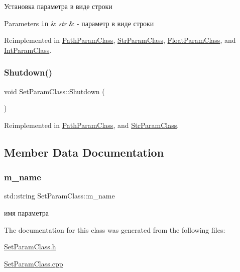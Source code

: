 Установка параметра в виде строки 


\begin{DoxyParams}[1]{Parameters}
\mbox{\tt in}  & {\em str} & -\/ параметр в виде строки \\
\hline
\end{DoxyParams}


Reimplemented in \hyperlink{class_path_param_class_a714cb515a6b746c83f81606a73b3e9dc}{Path\+Param\+Class}, \hyperlink{class_str_param_class_a4978b404ff3ebc96a13be228a86a8129}{Str\+Param\+Class}, \hyperlink{class_float_param_class_aa0068fb947c0c97301327bf2dd33392e}{Float\+Param\+Class}, and \hyperlink{class_int_param_class_af7fdd091d24986adef64f708b1d7fc11}{Int\+Param\+Class}.

\mbox{\label{class_set_param_class_afdb63374ca8c32f6678ba34e050e9071}} 
\subsubsection{\texorpdfstring{Shutdown()}{Shutdown()}}
{\footnotesize\ttfamily void Set\+Param\+Class\+::\+Shutdown (\begin{DoxyParamCaption}{ }\end{DoxyParamCaption})\hspace{0.3cm}{\ttfamily [virtual]}}



Reimplemented in \hyperlink{class_path_param_class_a24f272557eaa32ca6ee758932a7e5a97}{Path\+Param\+Class}, and \hyperlink{class_str_param_class_ae84185574803c2877e3b1b21a70fa6ac}{Str\+Param\+Class}.



\subsection{Member Data Documentation}
\mbox{\label{class_set_param_class_aab204889210304af482b414a6f8dbe82}} 
\subsubsection{\texorpdfstring{m\+\_\+name}{m\_name}}
{\footnotesize\ttfamily std\+::string Set\+Param\+Class\+::m\+\_\+name\hspace{0.3cm}{\ttfamily [protected]}}



имя параметра 



The documentation for this class was generated from the following files\+:\begin{DoxyCompactItemize}
\item 
\hyperlink{_set_param_class_8h}{Set\+Param\+Class.\+h}\item 
\hyperlink{_set_param_class_8cpp}{Set\+Param\+Class.\+cpp}\end{DoxyCompactItemize}
